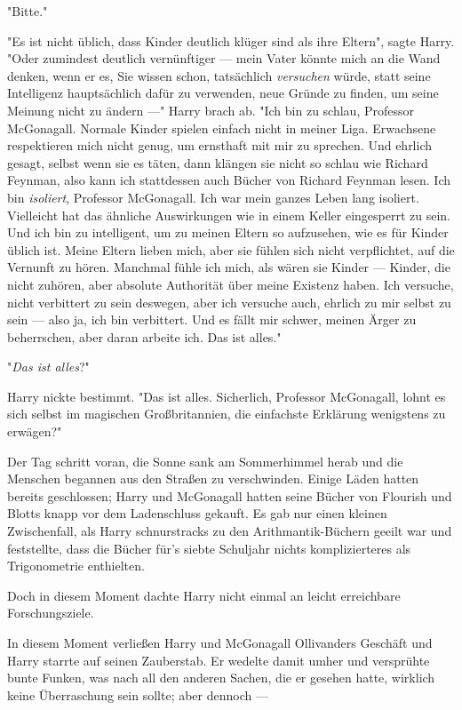 {"Bitte."

"Es ist nicht üblich, dass Kinder deutlich klüger sind als ihre Eltern", sagte Harry. "Oder zumindest deutlich vernünftiger --- mein Vater könnte mich an die Wand denken, wenn er es, Sie wissen schon, tatsächlich \emph{versuchen} würde, statt seine Intelligenz hauptsächlich dafür zu verwenden, neue Gründe zu finden, um seine Meinung nicht zu ändern ---" Harry brach ab. "Ich bin zu schlau, Professor McGonagall. Normale Kinder spielen einfach nicht in meiner Liga. Erwachsene respektieren mich nicht genug, um ernsthaft mit mir zu sprechen. Und ehrlich gesagt, selbst wenn sie es täten, dann klängen sie nicht so schlau wie Richard Feynman, also kann ich stattdessen auch Bücher von Richard Feynman lesen. Ich bin \emph{isoliert}, Professor McGonagall. Ich war mein ganzes Leben lang isoliert. Vielleicht hat das ähnliche Auswirkungen wie in einem Keller eingesperrt zu sein. Und ich bin zu intelligent, um zu meinen Eltern so aufzusehen, wie es für Kinder üblich ist. Meine Eltern lieben mich, aber sie fühlen sich nicht verpflichtet, auf die Vernunft zu hören. Manchmal fühle ich mich, als wären sie Kinder --- Kinder, die nicht zuhören, aber absolute Authorität über meine Existenz haben. Ich versuche, nicht verbittert zu sein deswegen, aber ich versuche auch, ehrlich zu mir selbst zu sein --- also ja, ich bin verbittert. Und es fällt mir schwer, meinen Ärger zu beherrschen, aber daran arbeite ich. Das ist alles."

"\emph{Das ist alles}?"

Harry nickte bestimmt. "Das ist alles. Sicherlich, Professor McGonagall, lohnt es sich selbst im magischen Großbritannien, die einfachste Erklärung wenigstens zu erwägen?"

\later

Der Tag schritt voran, die Sonne sank am Sommerhimmel herab und die Menschen begannen aus den Straßen zu verschwinden. Einige Läden hatten bereits geschlossen; Harry und McGonagall hatten seine Bücher von Flourish und Blotts knapp vor dem Ladenschluss gekauft. Es gab nur einen kleinen Zwischenfall, als Harry schnurstracks zu den Arithmantik-Büchern geeilt war und feststellte, dass die Bücher für's siebte Schuljahr nichts komplizierteres als Trigonometrie enthielten.

Doch in diesem Moment dachte Harry nicht einmal an leicht erreichbare Forschungsziele.

In diesem Moment verließen Harry und McGonagall Ollivanders Geschäft und Harry starrte auf seinen Zauberstab. Er wedelte damit umher und versprühte bunte Funken, was nach all den anderen Sachen, die er gesehen hatte, wirklich keine Überraschung sein sollte; aber dennoch ---

}
